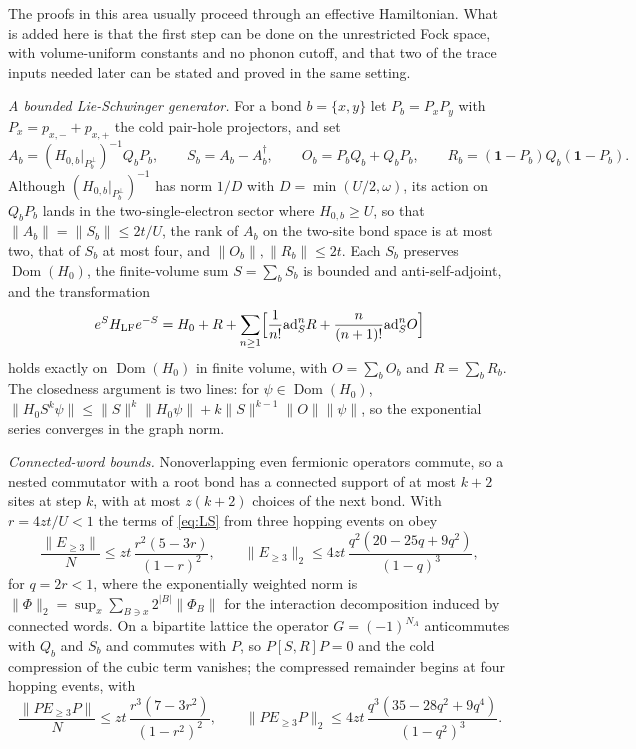 \documentclass[11pt]{article}
\theoremstyle{definition}
\theoremstyle{remark}
\begin{document}
The proofs in this area usually proceed through an effective Hamiltonian. What is
added here is that the first step can be done on the unrestricted Fock space, with
volume-uniform constants and no phonon cutoff, and that two of the trace inputs
needed later can be stated and proved in the same setting.

\emph{A bounded Lie-Schwinger generator.} For a bond $b=\{x,y\}$ let
$P_{b}=P_{x}P_{y}$ with $P_{x}=p_{x,-}+p_{x,+}$ the cold pair-hole projectors,
and set
\begin{equation}
A_{b}=(H_{0,b}|_{P_{b}^{\perp}})^{-1}Q_{b}P_{b},\qquad
S_{b}=A_{b}-A_{b}^{\dagger},\qquad
O_{b}=P_{b}Q_{b}+Q_{b}P_{b},\qquad
R_{b}=(\mathbf{1}-P_{b})Q_{b}(\mathbf{1}-P_{b}).
\end{equation}
Although $(H_{0,b}|_{P_{b}^{\perp}})^{-1}$ has norm $1/D$ with
$D=\min(U/2,\omega)$, its action on $Q_{b}P_{b}$ lands in the two-single-electron
sector where $H_{0,b}\ge U$, so that
$\|A_{b}\|=\|S_{b}\|\le2t/U$, the rank of $A_{b}$ on the two-site bond space is at
most two, that of $S_{b}$ at most four, and
$\|O_{b}\|,\|R_{b}\|\le2t$. Each $S_{b}$ preserves $\operatorname{Dom}(H_{0})$,
the finite-volume sum $S=\sum_{b}S_{b}$ is bounded and anti-self-adjoint, and the
transformation
\begin{equation}
e^{S}H_{\mathrm{LF}}e^{-S}=H_{0}+R+
\sum_{n\ge1}\Bigl[\frac1{n!}\mathrm{ad}_{S}^{n}R
+\frac{n}{(n+1)!}\mathrm{ad}_{S}^{n}O\Bigr]
\label{eq:LS}
\end{equation}
holds exactly on $\operatorname{Dom}(H_{0})$ in finite volume, with
$O=\sum_{b}O_{b}$ and $R=\sum_{b}R_{b}$. The closedness argument is two lines:
for $\psi\in\operatorname{Dom}(H_{0})$,
$\|H_{0}S^{k}\psi\|\le\|S\|^{k}\|H_{0}\psi\|+k\|S\|^{k-1}\|O\|\|\psi\|$, so the
exponential series converges in the graph norm.

\emph{Connected-word bounds.} Nonoverlapping even fermionic operators commute, so
a nested commutator with a root bond has a connected support of at most $k+2$
sites at step $k$, with at most $z(k+2)$ choices of the next bond. With
$r=4zt/U<1$ the terms of \eqref{eq:LS} from three hopping events on obey
\begin{equation}
\frac{\|E_{\ge3}\|}{N}\le zt\,\frac{r^{2}(5-3r)}{(1-r)^{2}},\qquad
\|E_{\ge3}\|_{2}\le4zt\,\frac{q^{2}(20-25q+9q^{2})}{(1-q)^{3}},
\label{eq:cw1}
\end{equation}
for $q=2r<1$, where the exponentially weighted norm is
$\|\Phi\|_{2}=\sup_{x}\sum_{B\ni x}2^{|B|}\|\Phi_{B}\|$ for the interaction
decomposition induced by connected words. On a bipartite lattice the operator
$G=(-1)^{N_{A}}$ anticommutes with $Q_{b}$ and $S_{b}$ and commutes with $P$, so
$P[S,R]P=0$ and the cold compression of the cubic term vanishes; the compressed
remainder begins at four hopping events, with
\begin{equation}
\frac{\|PE_{\ge3}P\|}{N}\le zt\,\frac{r^{3}(7-3r^{2})}{(1-r^{2})^{2}},\qquad
\|PE_{\ge3}P\|_{2}\le4zt\,\frac{q^{3}(35-28q^{2}+9q^{4})}{(1-q^{2})^{3}} .
\label{eq:cw2}
\end{equation}
\end{document}
